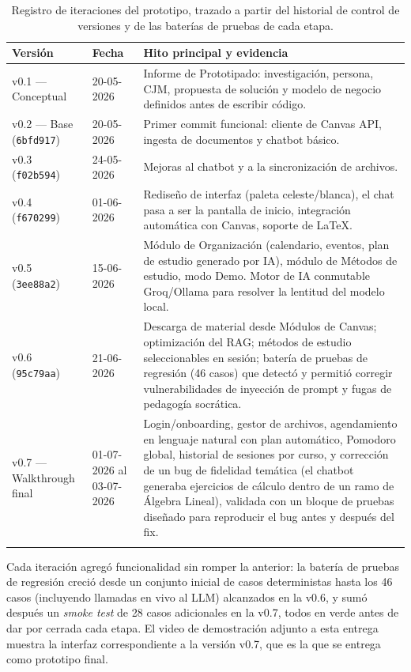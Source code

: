 \documentclass[11pt,a4paper]{article}
\begin{document}
\begin{longtable}{@{}p{2.9cm} p{2.1cm} p{9.7cm}@{}}
\toprule
\textbf{Versi\'on} & \textbf{Fecha} & \textbf{Hito principal y evidencia} \\
\midrule
\endhead
v0.1 --- Conceptual & 20-05-2026 & Informe de Prototipado: investigaci\'on, persona, CJM, propuesta de soluci\'on y modelo de negocio definidos antes de escribir c\'odigo. \\
v0.2 --- Base (\texttt{6bfd917}) & 20-05-2026 & Primer commit funcional: cliente de Canvas API, ingesta de documentos y chatbot b\'asico. \\
v0.3 (\texttt{f02b594}) & 24-05-2026 & Mejoras al chatbot y a la sincronizaci\'on de archivos. \\
v0.4 (\texttt{f670299}) & 01-06-2026 & Rediseño de interfaz (paleta celeste/blanca), el chat pasa a ser la pantalla de inicio, integraci\'on autom\'atica con Canvas, soporte de LaTeX. \\
v0.5 (\texttt{3ee88a2}) & 15-06-2026 & M\'odulo de Organizaci\'on (calendario, eventos, plan de estudio generado por IA), m\'odulo de M\'etodos de estudio, modo Demo. Motor de IA conmutable Groq/Ollama para resolver la lentitud del modelo local. \\
v0.6 (\texttt{95c79aa}) & 21-06-2026 & Descarga de material desde M\'odulos de Canvas; optimizaci\'on del RAG; m\'etodos de estudio seleccionables en sesi\'on; bater\'ia de pruebas de regresi\'on (46 casos) que detect\'o y permiti\'o corregir vulnerabilidades de inyecci\'on de prompt y fugas de pedagog\'ia socr\'atica. \\
v0.7 --- Walkthrough final & 01-07-2026 al 03-07-2026 & Login/onboarding, gestor de archivos, agendamiento en lenguaje natural con plan autom\'atico, Pomodoro global, historial de sesiones por curso, y correcci\'on de un bug de fidelidad tem\'atica (el chatbot generaba ejercicios de c\'alculo dentro de un ramo de \'Algebra Lineal), validada con un bloque de pruebas dise\~nado para reproducir el bug antes y despu\'es del fix. \\
\bottomrule
\caption{Registro de iteraciones del prototipo, trazado a partir del historial de control de versiones y de las bater\'ias de pruebas de cada etapa.}
\end{longtable}

Cada iteraci\'on agreg\'o funcionalidad sin romper la anterior: la bater\'ia de pruebas de regresi\'on creci\'o desde un conjunto inicial de casos deterministas hasta los 46 casos (incluyendo llamadas en vivo al LLM) alcanzados en la v0.6, y sum\'o despu\'es un \emph{smoke test} de 28 casos adicionales en la v0.7, todos en verde antes de dar por cerrada cada etapa. El video de demostraci\'on adjunto a esta entrega muestra la interfaz correspondiente a la versi\'on v0.7, que es la que se entrega como prototipo final.
\end{document}
